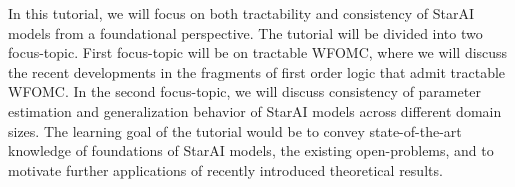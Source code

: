      In this tutorial, we will focus on both tractability and consistency of StarAI models from a foundational perspective. The tutorial will be divided into two focus-topic. First focus-topic will be on tractable WFOMC, where we will discuss the recent developments in the fragments of first order logic that admit tractable WFOMC. In the second focus-topic, we will discuss consistency of parameter estimation and generalization behavior of StarAI models across different domain sizes. The learning goal of the tutorial would be to convey state-of-the-art knowledge of foundations of StarAI models, the existing open-problems, and to motivate further applications of recently introduced theoretical results.
     

    
    


    
    
